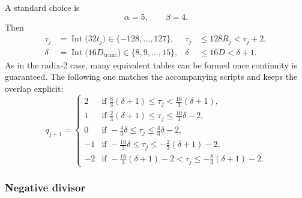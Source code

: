 \documentclass[11pt]{article}
\DeclareMathOperator{\Int}{Int}
\numberwithin{equation}{section}
\begin{document}
A standard choice is
\begin{equation}
  \label{eq:division:radix4_alpha_beta_choice}
  \alpha = 5,
  \qquad
  \beta = 4.
\end{equation}
Then
\begin{align}
  \label{eq:division:radix4_tau_val}
  \tau_j &= \Int\bigl(32t_j\bigr) \in \{-128,\dotsc,127\},
  &
  \tau_j &\le 128R_j < \tau_j+2, \\
  \label{eq:division:radix4_delta_val}
  \delta &= \Int\bigl(16D_{\text{trunc}}\bigr) \in \{8,9,\dotsc,15\},
  &
  \delta &\le 16D < \delta+1.
\end{align}
As in the radix-2 case, many equivalent tables can be formed once continuity is guaranteed.
The following one matches the accompanying scripts and keeps the overlap explicit:
\begin{equation}
  \label{eq:division:radix4_logic_pos}
  q_{j+1} =
  \begin{cases}
    2  & \text{if } \frac{8}{3}(\delta+1) \le \tau_j < \frac{16}{3}(\delta+1), \\
    1  & \text{if } \frac{2}{3}(\delta+1) \le \tau_j \le \frac{10}{3}\delta - 2, \\
    0  & \text{if } -\frac{4}{3}\delta \le \tau_j \le \frac{4}{3}\delta - 2, \\
    -1 & \text{if } -\frac{10}{3}\delta \le \tau_j \le -\frac{2}{3}(\delta+1) - 2, \\
    -2 & \text{if } -\frac{16}{3}(\delta+1) - 2 < \tau_j \le -\frac{8}{3}(\delta+1) - 2.
  \end{cases}
\end{equation}

\subsubsection{Negative divisor}
\label{sssec:division:radix4_neg}
\end{document}
